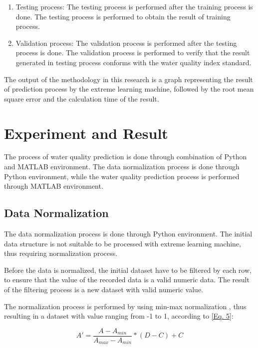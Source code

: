 \documentclass[journal,comsoc]{IEEEtran}
\begin{document}
\begin{enumerate}
\item Testing process: The testing process is performed after the training process is done. The testing process is performed to obtain the result of training process.

\item Validation process: The validation process is performed after the testing process is done. The validation process is performed to verify that the result generated in testing process conforms with the water quality index standard.

\end{enumerate}

The output of the methodology in this research is a graph representing the result of prediction process by the extreme learning machine, followed by the root mean square error and the calculation time of the result.

\section{Experiment and Result}

The process of water quality prediction is done through combination of Python and MATLAB environment. The data normalization process is done through Python environment, while the water quality prediction process is performed through MATLAB environment.

\subsection{Data Normalization}

The data normalization process is done through Python environment. The initial data structure is not suitable to be processed with extreme learning machine, thus requiring normalization process.

Before the data is normalized, the initial dataset have to be filtered by each row, to ensure that the value of the recorded data is a valid numeric data. The result of the filtering process is a new dataset with valid numeric value.

The normalization process is performed by using min-max normalization\cite{22} , thus resulting in a dataset with value ranging from -1 to 1, according to \eqref{Eq. 5}:

\begin{equation}
A' = \frac{A - A_{min}}{A_{max} - A_{min}} * (D - C) + C\label{Eq. 5}
\end{equation}
\end{document}
